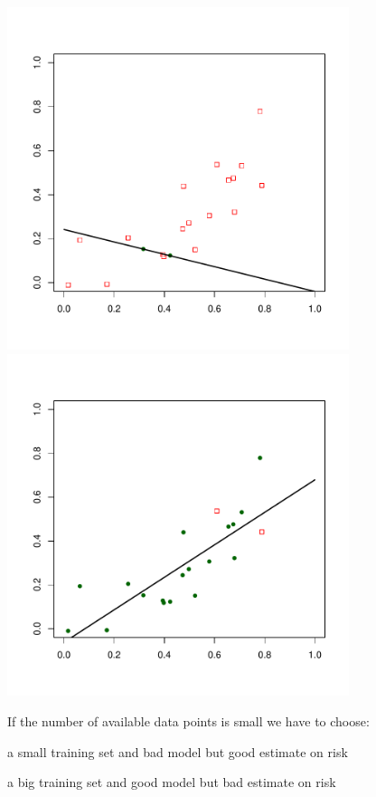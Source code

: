 \documentclass[landscape,footrule]{foils}
\begin{document}

\begin{center}
\includegraphics[width=10cm]{sample-split-1}\hspace*{1cm}
\includegraphics[width=10cm]{sample-split-2}
\end{center}
\vspace{-1cm}

If the number of available data points is small we have to choose:
\begin{triangles}
\item a small training set and bad model but good estimate on risk
\item a big training set and good model but bad estimate on risk
\end{triangles}
\end{document}
